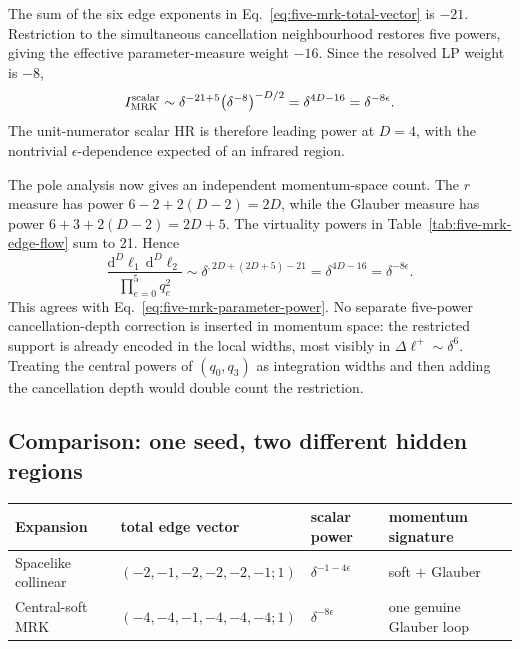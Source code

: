 \documentclass[a4paper,11pt]{article}
\newcommand{\dd}{\mathrm d}
\begin{document}
The sum of the six edge exponents in
Eq.~\eqref{eq:five-mrk-total-vector} is \(-21\).  Restriction to the
simultaneous cancellation neighbourhood restores five powers, giving the
effective parameter-measure weight \(-16\).  Since the resolved LP weight is
\(-8\),
\begin{equation}
 I_{\rm MRK}^{\rm scalar}\sim
 \delta^{-21+5}\bigl(\delta^{-8}\bigr)^{-D/2}
 =\delta^{4D-16}=\delta^{-8\epsilon}.
 \label{eq:five-mrk-parameter-power}
\end{equation}
The unit-numerator scalar HR is therefore leading power at \(D=4\), with the
nontrivial \(\epsilon\)-dependence expected of an infrared region.

The pole analysis now gives an independent momentum-space count.  The
\(r\) measure has power
\(6-2+2(D-2)=2D\), while the Glauber measure has power
\(6+3+2(D-2)=2D+5\).  The virtuality powers in
Table~\ref{tab:five-mrk-edge-flow} sum to 21.  Hence
\begin{equation}
 \frac{\dd^D\ell_1\,\dd^D\ell_2}
      {\prod_{e=0}^{5}q_e^2}
 \sim\delta^{,2D+(2D+5)-21}
 =\delta^{4D-16}=\delta^{-8\epsilon}.
 \label{eq:five-mrk-momentum-power}
\end{equation}
This agrees with Eq.~\eqref{eq:five-mrk-parameter-power}.  No separate
five-power cancellation-depth correction is inserted in momentum space: the
restricted support is already encoded in the local widths, most visibly in
\(\Delta\ell^+\sim\delta^6\).  Treating the central powers of \((q_0,q_3)\)
as integration widths and then adding the cancellation depth would double
count the restriction.

\subsection{Comparison: one seed, two different hidden regions}

\begin{center}
\small
\begin{tabular}{@{}p{}p{}p{}p{}@{}}
\toprule
Expansion & total edge vector & scalar power & momentum signature\\
\midrule
Spacelike collinear &
\((-2,-1,-2,-2,-2,-1;1)\) &
\(\delta^{-1-4\epsilon}\) &
soft \(+\) Glauber\\
Central-soft MRK &
\((-4,-4,-1,-4,-4,-4;1)\) &
\(\delta^{-8\epsilon}\) &
one genuine Glauber loop\\
\bottomrule
\end{tabular}
\end{center}
\end{document}

